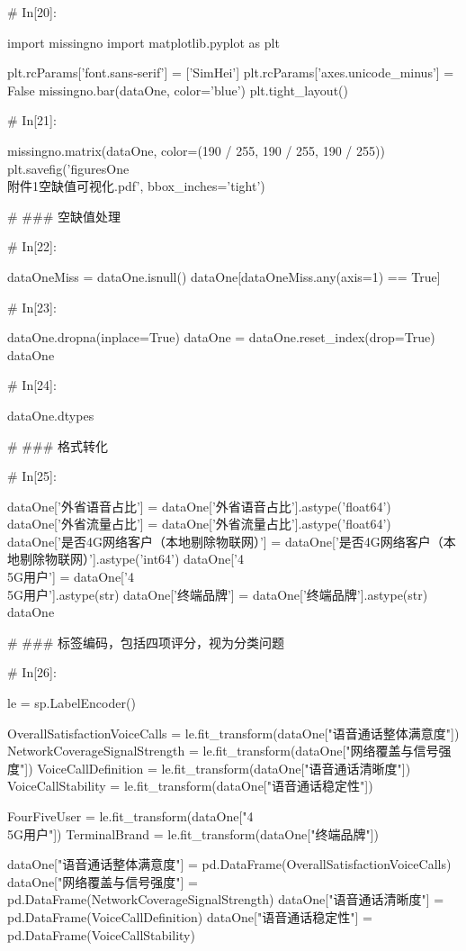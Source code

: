 \documentclass{MathorCupmodeling}
\begin{document}
\begin{python}
	# In[20]:
	
	
	import missingno
	import matplotlib.pyplot as plt
	
	plt.rcParams['font.sans-serif'] = ['SimHei']
	plt.rcParams['axes.unicode_minus'] = False
	missingno.bar(dataOne, color='blue')
	plt.tight_layout()
	
	# In[21]:
	
	
	missingno.matrix(dataOne, color=(190 / 255, 190 / 255, 190 / 255))
	plt.savefig('figuresOne\\[附件1]附件1空缺值可视化.pdf', bbox_inches='tight')
	
	# ### 空缺值处理
	
	# In[22]:
	
	
	dataOneMiss = dataOne.isnull()
	dataOne[dataOneMiss.any(axis=1) == True]
	
	# In[23]:
	
	
	dataOne.dropna(inplace=True)
	dataOne = dataOne.reset_index(drop=True)
	dataOne
	
	# In[24]:
	
	
	dataOne.dtypes
	
	# ### 格式转化
	
	# In[25]:
	
	
	dataOne['外省语音占比'] = dataOne['外省语音占比'].astype('float64')
	dataOne['外省流量占比'] = dataOne['外省流量占比'].astype('float64')
	dataOne['是否4G网络客户（本地剔除物联网）'] = dataOne['是否4G网络客户（本地剔除物联网）'].astype('int64')
	dataOne['4\\5G用户'] = dataOne['4\\5G用户'].astype(str)
	dataOne['终端品牌'] = dataOne['终端品牌'].astype(str)
	dataOne
	
	# ### 标签编码，包括四项评分，视为分类问题
	
	# In[26]:
	
	
	le = sp.LabelEncoder()
	
	OverallSatisfactionVoiceCalls = le.fit_transform(dataOne["语音通话整体满意度"])
	NetworkCoverageSignalStrength = le.fit_transform(dataOne["网络覆盖与信号强度"])
	VoiceCallDefinition = le.fit_transform(dataOne["语音通话清晰度"])
	VoiceCallStability = le.fit_transform(dataOne["语音通话稳定性"])
	
	FourFiveUser = le.fit_transform(dataOne["4\\5G用户"])
	TerminalBrand = le.fit_transform(dataOne["终端品牌"])
	
	dataOne["语音通话整体满意度"] = pd.DataFrame(OverallSatisfactionVoiceCalls)
	dataOne["网络覆盖与信号强度"] = pd.DataFrame(NetworkCoverageSignalStrength)
	dataOne["语音通话清晰度"] = pd.DataFrame(VoiceCallDefinition)
	dataOne["语音通话稳定性"] = pd.DataFrame(VoiceCallStability)
	

\end{python}
\end{document}
